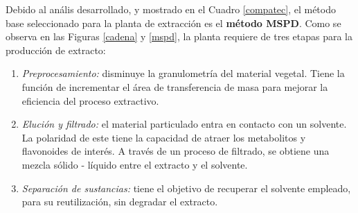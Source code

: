 Debido al an\'alis desarrollado, y mostrado en el Cuadro \ref{compatec}, el m\'etodo base seleccionado para la planta de extracci\'on es el \textbf{m\'etodo MSPD}. Como se observa en las Figuras \ref{cadena} y \ref{mspd}, la planta requiere de tres etapas para la producci\'on de extracto:

\begin{enumerate}
	\item \textit{Preprocesamiento:} disminuye la granulometr\'ia del material vegetal. Tiene la funci\'on de incrementar el \'area de transferencia de masa para mejorar la eficiencia del proceso extractivo.
	\item \textit{Eluci\'on y filtrado:} el material particulado entra en contacto con un solvente. La polaridad de este tiene la capacidad de atraer los metabolitos y flavonoides de inter\'es. A trav\'es de un proceso de filtrado, se obtiene una mezcla s\'olido - l\'iquido entre el extracto y el solvente.
	\item \textit{Separaci\'on de sustancias:} tiene el objetivo de recuperar el solvente empleado, para su reutilizaci\'on, sin degradar el extracto.
\end{enumerate}